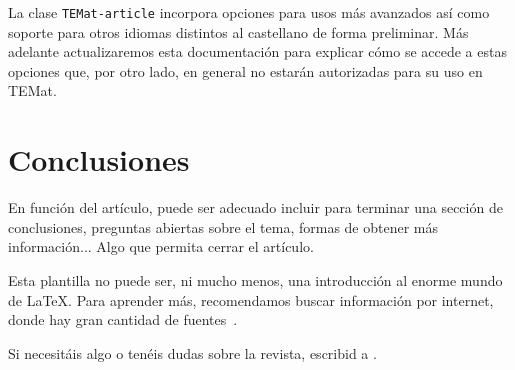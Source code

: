 \documentclass[bibtex, anon]{TEMat-article}
\begin{document}
La clase \verb+TEMat-article+ incorpora opciones para usos más avanzados así como soporte para otros idiomas distintos al castellano de forma preliminar.
Más adelante actualizaremos esta documentación para explicar cómo se accede a estas opciones que, por otro lado, en general no estarán autorizadas para su uso en TEMat.


\section{Conclusiones}

En función del artículo, puede ser adecuado incluir para terminar una sección de conclusiones, preguntas abiertas sobre el tema, formas de obtener más información...
Algo que permita cerrar el artículo.

Esta plantilla no puede ser, ni mucho menos, una introducción al enorme mundo de \LaTeX.
Para aprender más, recomendamos buscar información por internet, donde hay gran cantidad de fuentes~\cite{wiki:latex, stackexchange, texample}.

Si necesitáis algo o tenéis dudas sobre la revista, escribid a .

\nocite{*}
\printbibliography[heading=bibintoc]
\end{document}
